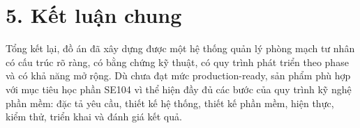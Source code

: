 \section*{5. Kết luận chung}

Tổng kết lại, đồ án đã xây dựng được một hệ thống quản lý phòng mạch tư nhân có cấu trúc rõ ràng, có bằng chứng kỹ thuật, có quy trình phát triển theo phase và có khả năng mở rộng. Dù chưa đạt mức production-ready, sản phẩm phù hợp với mục tiêu học phần SE104 vì thể hiện đầy đủ các bước của quy trình kỹ nghệ phần mềm: đặc tả yêu cầu, thiết kế hệ thống, thiết kế phần mềm, hiện thực, kiểm thử, triển khai và đánh giá kết quả.
